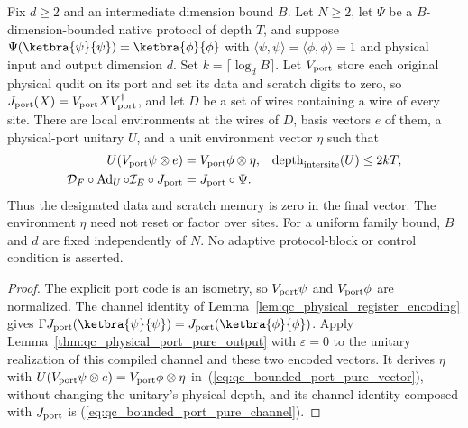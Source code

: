 \begin{lemma}
    \label{lem:qc_bounded_port_pure_output}
    Fix $d\ge2$ and an intermediate dimension bound $B$. Let $N\ge2$,
    let $\Psi$ be a $B$-dimension-bounded native protocol of depth $T$,
    and suppose
    $\Psi(\ketbra{\psi}{\psi})=\ketbra{\phi}{\phi}$ with
    $\langle\psi,\psi\rangle=\langle\phi,\phi\rangle=1$ and physical input and output
    dimension $d$. Set $k=\lceil\log_d B\rceil$. Let $V_{\rm port}$ store each original
    physical qudit on its port and set its data and scratch digits to zero,
    so $J_{\rm port}(X)=V_{\rm port}XV_{\rm port}^\dagger$, and let $D$ be a set of wires
    containing a wire of every site.
    There are local environments at the wires of $D$, basis vectors $e$ of them, a
    physical-port unitary $U$, and a unit environment vector $\eta$ such that
    \begin{align}
        U(V_{\rm port}\psi\otimes e)
         & =V_{\rm port}\phi\otimes\eta,
         & \operatorname{depth}_{\rm intersite}(U) & \le2kT,
        \label{eq:qc_bounded_port_pure_vector}               \\
        \mathcal D_F\circ\operatorname{Ad}_U\circ\mathcal I_E\circ J_{\rm port}
         & =J_{\rm port}\circ\Psi.
        \label{eq:qc_bounded_port_pure_channel}
    \end{align}
    Thus the designated data and scratch memory is zero in the
    final vector. The environment $\eta$ need not reset or factor over
    sites. For a uniform family bound, $B$ and $d$ are fixed independently
    of $N$. No adaptive protocol-block or control condition is asserted.
\end{lemma}
\begin{proof}
    The explicit port code is an isometry, so $V_{\rm port}\psi$ and $V_{\rm port}\phi$ are
    normalized. The channel identity of
    Lemma~\ref{lem:qc_physical_register_encoding} gives
    $\Gamma J_{\rm port}(\ketbra{\psi}{\psi})
        =J_{\rm port}(\ketbra{\phi}{\phi})$.
    Apply Lemma~\ref{thm:qc_physical_port_pure_output} with $\varepsilon=0$ to the unitary
    realization of this compiled channel and these two encoded vectors. It derives $\eta$ with
    $U(V_{\rm port}\psi\otimes e)=V_{\rm port}\phi\otimes\eta$
    in~(\ref{eq:qc_bounded_port_pure_vector}), without changing the
    unitary's physical depth, and its channel identity composed with $J_{\rm port}$ is
    (\ref{eq:qc_bounded_port_pure_channel}).
\end{proof}


